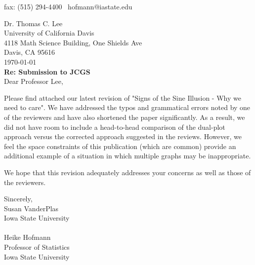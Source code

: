 \documentclass[11pt]{article}
\begin{document}
\hfill fax: (515) 294-4400\newline\hfill\ \phantom{.} \hfill
hofmann@iastate.edu\newline

Dr. Thomas C. Lee\\
University of California Davis\\
4118 Math Science Building, One Shields Ave\\
Davis, CA 95616\\
 
\today\\ 

{\bf Re: Submission to JCGS}\\

Dear Professor Lee,

Please find attached our latest revision of "Signs of the Sine Illusion - Why we need to care". We have addressed the typos and grammatical errors noted by one of the reviewers and have also shortened the paper significantly. As a result, we did not have room to include a head-to-head comparison of the dual-plot approach versus the corrected approach suggested in the reviews. However, we feel the space constraints of this publication (which are common) provide an additional example of a situation in which multiple graphs may be inappropriate.

We hope that this revision adequately addresses your concerns as well as those of the reviewers.

\hfill\newline
\vspace{0.25in}
%
Sincerely,\\
Susan VanderPlas\\
Iowa State University\\\\

Heike Hofmann\\
Professor of Statistics\\
Iowa State University\\
\end{document}
